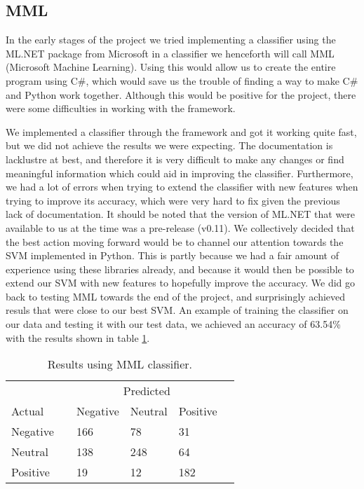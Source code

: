 \subsection{MML} \label{MML}
In the early stages of the project we tried implementing a classifier using the ML.NET package from Microsoft in a classifier we henceforth will call MML (Microsoft Machine Learning). Using this would allow us to create the entire program using C\#, which would save us the trouble of finding a way to make C\# and Python work together. Although this would be positive for the project, there were some difficulties in working with the framework.

We implemented a classifier through the framework and got it working quite fast, but we did not achieve the results we were expecting. The documentation is lacklustre at best, and therefore it is very difficult to make any changes or find meaningful information which could aid in improving the classifier. Furthermore, we had a lot of errors when trying to extend the classifier with new features when trying to improve its accuracy, which were very hard to fix given the previous lack of documentation. It should be noted that the version of ML.NET that were available to us at the time was a pre-release (v0.11\cite{mlnetrelease}). We collectively decided that the best action moving forward would be to channel our attention towards the SVM implemented in Python. This is partly because we had a fair amount of experience using these libraries already, and because it would then be possible to extend our SVM with new features to hopefully improve the accuracy. We did go back to testing MML towards the end of the project, and surprisingly achieved resuls that were close to our best SVM. An example of training the classifier on our data and testing it with our test data, we achieved an accuracy of 63.54\% with the results shown in table \ref{mlnet}.

\begin{table}[H]
	\begin{tabular}{@{}llllll@{}}
		\toprule
		& & \multicolumn{3}{c}{Predicted} \\\cmidrule{3-5}
		Actual & & Negative & Neutral & Positive &  \\ \midrule
		Negative & & 166 & 78 & 31 & \\
		Neutral  & & 138 & 248 & 64 & \\
		Positive & & 19 & 12 & 182 & \\ \bottomrule
	\end{tabular}
	\centering
	\caption{Results using MML classifier.}
	\label{mlnet}
\end{table}

